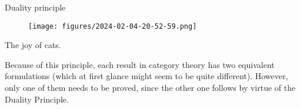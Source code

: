 \begin{definition}
    
\end{definition}

\begin{definition}
    
\end{definition}


\begin{definition}
    
\end{definition}



    


Duality principle

\begin{figure}[!htb]
    \centering
    \texttt{[image: figures/2024-02-04-20-52-59.png]}
    \caption{}%
\end{figure}

The joy of cats.

Because of this principle, each result in category theory has two equivalent formulations
(which at first glance might seem to be quite different). However, only one of them needs
to be proved, since the other one follows by virtue of the Duality Principle.
